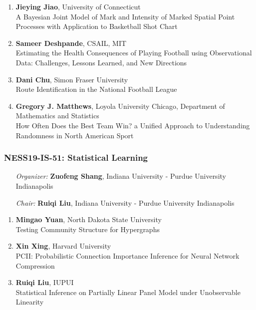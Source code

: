 \begin{enumerate}
\item \textbf{Jieying Jiao}, University of Connecticut \\
A Bayesian Joint Model of Mark and Intensity of Marked   Spatial Point Processes with Application to Basketball Shot Chart
\item \textbf{Sameer Deshpande}, CSAIL, MIT \\
Estimating the Health Consequences of Playing Football using Observational Data: Challenges, Lessons Learned, and New Directions
\item \textbf{Dani Chu}, Simon Fraser University \\
Route Identification in the National Football League
\item \textbf{Gregory J. Matthews}, Loyola University Chicago, Department of Mathematics and Statistics \\
How Often Does the Best Team Win? a Unified Approach to Understanding Randomness in North American Sport
\end{enumerate}

\subsubsection*{NESS19-IS-51: Statistical Learning}

\begin{enumerate}[align=left]
\item [\emph{Organizer:}] \textbf{Zuofeng Shang}, Indiana University - Purdue University Indianapolis
\item [\emph{Chair:}] \textbf{Ruiqi Liu},  Indiana University - Purdue University Indianapolis
\end{enumerate}

\begin{enumerate}
\item \textbf{Mingao Yuan}, North Dakota State University \\
Testing Community Structure for Hypergraphs
\item \textbf{Xin Xing}, Harvard University \\
PCII: Probabilistic Connection Importance Inference for Neural Network Compression
\item \textbf{Ruiqi Liu}, IUPUI \\
Statistical Inference on Partially Linear Panel Model under Unobservable Linearity
\end{enumerate}

